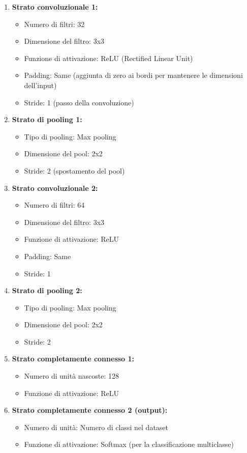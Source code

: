 \documentclass{article}
\begin{document}
\begin{enumerate}
    \item \textbf{Strato convoluzionale 1:}
    \begin{itemize}
        \item Numero di filtri: 32
        \item Dimensione del filtro: 3x3
        \item Funzione di attivazione: ReLU (Rectified Linear Unit)
        \item Padding: Same (aggiunta di zero ai bordi per mantenere le dimensioni dell'input)
        \item Stride: 1 (passo della convoluzione)
    \end{itemize}
    
    \item \textbf{Strato di pooling 1:}
    \begin{itemize}
        \item Tipo di pooling: Max pooling
        \item Dimensione del pool: 2x2
        \item Stride: 2 (spostamento del pool)
    \end{itemize}
    
    \item \textbf{Strato convoluzionale 2:}
    \begin{itemize}
        \item Numero di filtri: 64
        \item Dimensione del filtro: 3x3
        \item Funzione di attivazione: ReLU
        \item Padding: Same
        \item Stride: 1
    \end{itemize}
    
    \item \textbf{Strato di pooling 2:}
    \begin{itemize}
        \item Tipo di pooling: Max pooling
        \item Dimensione del pool: 2x2
        \item Stride: 2
    \end{itemize}
    
    \item \textbf{Strato completamente connesso 1:}
    \begin{itemize}
        \item Numero di unità nascoste: 128
        \item Funzione di attivazione: ReLU
    \end{itemize}
    
    \item \textbf{Strato completamente connesso 2 (output):}
    \begin{itemize}
        \item Numero di unità: Numero di classi nel dataset
        \item Funzione di attivazione: Softmax (per la classificazione multiclasse)
    \end{itemize}
\end{enumerate}
\end{document}
